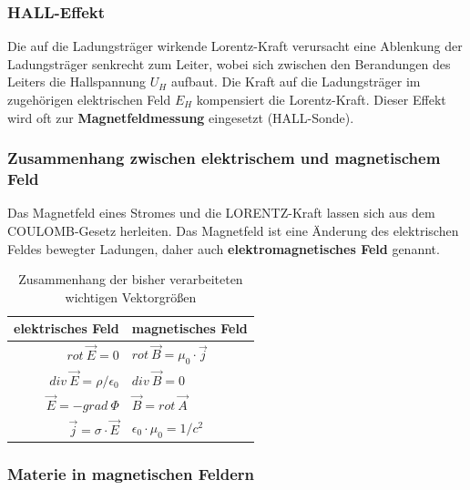 \documentclass[12pt,a4paper,ngerman]{article}
\begin{document}
\pagebreak


\subsubsection*{HALL-Effekt}
Die auf die Ladungsträger wirkende Lorentz-Kraft verursacht eine Ablenkung der Ladungsträger senkrecht zum Leiter, wobei sich zwischen den Berandungen des Leiters die Hallspannung $U_H$ aufbaut. Die Kraft auf die Ladungsträger im zugehörigen elektrischen Feld $E_H$ kompensiert die Lorentz-Kraft. Dieser Effekt wird oft zur \textbf{Magnetfeldmessung} eingesetzt (HALL-Sonde). 

\subsubsection*{Zusammenhang zwischen elektrischem und magnetischem Feld}
Das Magnetfeld eines Stromes und die LORENTZ-Kraft lassen sich aus dem COULOMB-Gesetz herleiten. Das Magnetfeld ist eine Änderung des elektrischen Feldes bewegter Ladungen, daher auch \textbf{elektromagnetisches Feld} genannt. 
\begin{table}[h!]
  \begin{center}
    \begin{tabular}{| r |  l |}
    \hline
    elektrisches Feld & magnetisches Feld  \\ \hline \hline
    $rot \ \vec{E} = 0$ & 	$rot \ \vec{B} = \mu_0 \cdot \vec{j}$  \\ \hline
    $div \ \vec{E} = \rho / \epsilon_0$ & $div \ \vec{B} = 0$  \\ \hline
    $\vec{E} = -grad \ \Phi$ & $\vec{B} = rot \ \vec{A}$ \\ \hline
    $\vec{j} = \sigma \cdot \vec{E}$ & $\epsilon_0 \cdot \mu_0 = 1 / c^2$ \\
    \hline
    \end{tabular}
  \end{center}
  \caption{Zusammenhang der bisher verarbeiteten wichtigen Vektorgrößen}
\end{table}

\subsubsection*{Materie in magnetischen Feldern}
\end{document}
